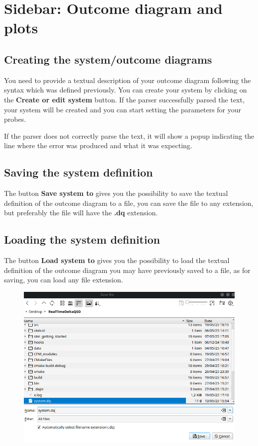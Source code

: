 \section{Sidebar: Outcome diagram and plots}

    \subsection{Creating the system/outcome diagrams}

    You need to provide a textual description of your outcome diagram following the syntax which was defined previously.
    You can create your system by clicking on the \textbf{Create or edit system} button. If the parser successfully parsed the text, your system will be created and you can start setting the parameters for your probes.
    
    If the parser does not correctly parse the text, it will show a popup indicating the line where the error was produced and what it was expecting. 
    
    \subsection{Saving the system definition}

    The button \textbf{Save system to} gives you the possibility to save the textual definition of the outcome diagram to a file, you can save the file to any extension, but preferably the file will have the \textbf{.dq} extension.

    \subsection{Loading the system definition}

    The button \textbf{Load system to} gives you the possibility to load the textual definition of the outcome diagram you may have previously saved to a file, as for saving, you can load any file extension.

    
    \begin{figure}[H]
        \begin{center}
            \includegraphics[width = \textwidth]{img/save_system.png}
        \end{center}
    \end{figure}
        
